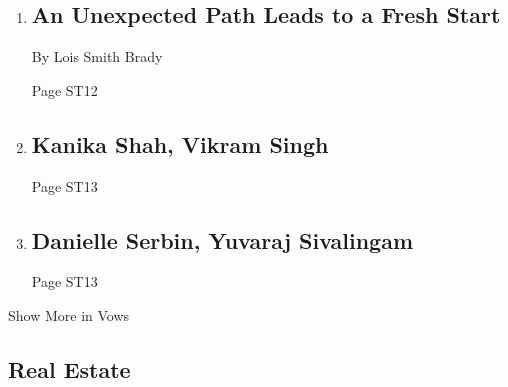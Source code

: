 \begin{enumerate}
\def\labelenumi{\arabic{enumi}.}
\item
  \href{/2020/02/14/fashion/weddings/an-unexpected-path-leads-to-a-fresh-start.html}{}

  \hypertarget{an-unexpected-path-leads-to-a-fresh-start}{%
  \subsection{An Unexpected Path Leads to a Fresh
  Start}\label{an-unexpected-path-leads-to-a-fresh-start}}

  By Lois Smith Brady

  Page ST12
\item
  \href{/2020/02/16/fashion/weddings/kanika-shah-vikram-singh.html}{}

  \hypertarget{kanika-shah-vikram-singh}{%
  \subsection{Kanika Shah, Vikram
  Singh}\label{kanika-shah-vikram-singh}}

  Page ST13
\item
  \href{/2020/02/16/fashion/weddings/danielle-serbin-yuvaraj-sivalingam.html}{}

  \hypertarget{danielle-serbin-yuvaraj-sivalingam}{%
  \subsection{Danielle Serbin, Yuvaraj
  Sivalingam}\label{danielle-serbin-yuvaraj-sivalingam}}

  Page ST13
\end{enumerate}

Show More in Vows

\hypertarget{real-estate}{%
\subsection{Real Estate}\label{real-estate}}

